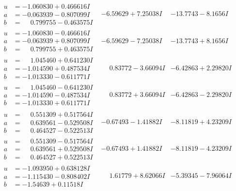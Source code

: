 \documentclass[1p]{elsarticle_modified}
\theoremstyle{definition}
\begin{document}
$$\begin{array}{c|c|c}
\begin{aligned}
u &= -1.060830 + 0.466616 I \\
a &= -0.063939 - 0.807099 I \\
b &= \phantom{-}0.799755 - 0.463575 I\end{aligned}
 & -6.59629 + 7.25038 I & -13.7743 - 8.1656 I \\ \hline\begin{aligned}
u &= -1.060830 - 0.466616 I \\
a &= -0.063939 + 0.807099 I \\
b &= \phantom{-}0.799755 + 0.463575 I\end{aligned}
 & -6.59629 - 7.25038 I & -13.7743 + 8.1656 I \\ \hline\begin{aligned}
u &= \phantom{-}1.045460 + 0.641230 I \\
a &= -1.014590 + 0.487534 I \\
b &= -1.013330 - 0.611771 I\end{aligned}
 & \phantom{-}0.83772 - 3.66094 I & -6.42863 + 2.29820 I \\ \hline\begin{aligned}
u &= \phantom{-}1.045460 - 0.641230 I \\
a &= -1.014590 - 0.487534 I \\
b &= -1.013330 + 0.611771 I\end{aligned}
 & \phantom{-}0.83772 + 3.66094 I & -6.42863 - 2.29820 I \\ \hline\begin{aligned}
u &= \phantom{-}0.551309 + 0.517564 I \\
a &= \phantom{-}0.639561 - 0.529508 I \\
b &= \phantom{-}0.464527 - 0.522513 I\end{aligned}
 & -0.67493 - 1.41882 I & -8.11819 + 4.23209 I \\ \hline\begin{aligned}
u &= \phantom{-}0.551309 - 0.517564 I \\
a &= \phantom{-}0.639561 + 0.529508 I \\
b &= \phantom{-}0.464527 + 0.522513 I\end{aligned}
 & -0.67493 + 1.41882 I & -8.11819 - 4.23209 I \\ \hline\begin{aligned}
u &= -1.093950 + 0.638128 I \\
a &= -1.115430 - 0.808402 I \\
b &= -1.54639 + 0.11518 I\end{aligned}
 & \phantom{-}1.61779 + 8.62066 I & -5.39345 - 7.96064 I \\ \hline\begin{aligned}

\end{aligned}
\end{array}$$
\end{document}
